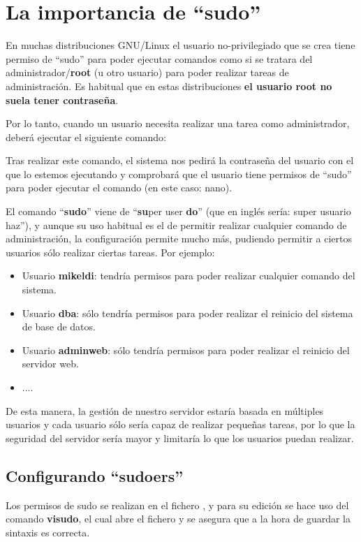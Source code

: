 \documentclass{../../../yukibook.cls/yukibook}
\begin{document}
\section{La importancia de “sudo”}
En muchas distribuciones GNU/Linux el usuario no-privilegiado que se crea tiene permiso de “sudo” para poder ejecutar comandos como si se tratara del administrador/\textbf{root} (u otro usuario) para poder realizar tareas de administración. Es habitual que en estas distribuciones \textbf{el usuario root no suela tener contraseña}. 

Por lo tanto, cuando un usuario necesita realizar una tarea como administrador, deberá ejecutar el siguiente comando:


Tras realizar este comando, el sistema nos pedirá la contraseña del usuario con el que lo estemos ejecutando y comprobará que el usuario tiene permisos de “sudo” para poder ejecutar el comando (en este caso: nano). 

El comando “\textbf{sudo}” viene de “\textbf{su}per user \textbf{do}” (que en inglés sería: super usuario haz”), y aunque su uso habitual es el de permitir realizar cualquier comando de administración, la configuración permite mucho más, pudiendo permitir a ciertos usuarios sólo realizar ciertas tareas. Por ejemplo:

\begin{itemize}
    \item Usuario \textbf{mikeldi}: tendría permisos para poder realizar cualquier comando del sistema.
    \item Usuario \textbf{dba}: sólo tendría permisos para poder realizar el reinicio del sistema de base de datos.
    \item Usuario \textbf{adminweb}: sólo tendría permisos para poder realizar el reinicio del servidor web.
    \item ....
\end{itemize}

De esta manera, la gestión de nuestro servidor estaría basada en múltiples usuarios y cada usuario sólo sería capaz de realizar pequeñas tareas, por lo que la seguridad del servidor sería mayor y limitaría lo que los usuarios puedan realizar.

\subsection{Configurando “sudoers”}
Los permisos de sudo se realizan en el fichero   , y para su edición se hace uso del comando \textbf{visudo}, el cual abre el fichero y se asegura que a la hora de guardar la sintaxis es correcta.
\end{document}
